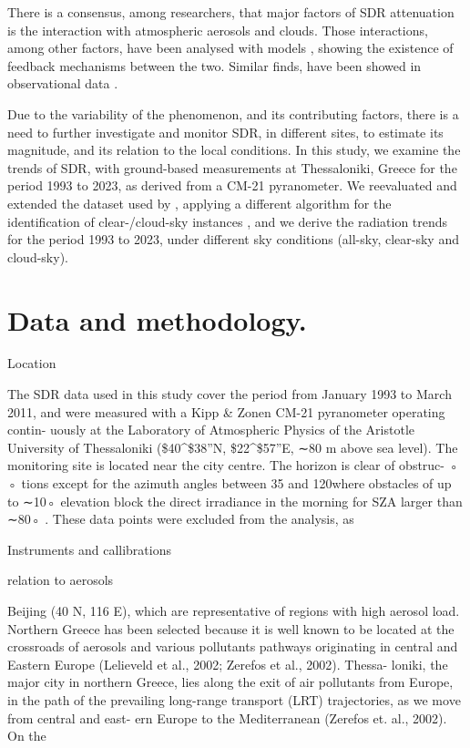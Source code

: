 \documentclass[preprint, 3p,
authoryear]{elsarticle} %
\begin{document}
There is a consensus, among researchers, that major factors of SDR
attenuation is the interaction with atmospheric aerosols and clouds.
Those interactions, among other factors, have been analysed with models
\citep{Li2016, Samset2018}, showing the existence of feedback mechanisms
between the two. Similar finds, have been showed in observational data
\citep[ and references
therein]{Schwarz2020, Ohvril2009, Zerefos2009, Xia2007}.

Due to the variability of the phenomenon, and its contributing factors,
there is a need to further investigate and monitor SDR, in different
sites, to estimate its magnitude, and its relation to the local
conditions. In this study, we examine the trends of SDR, with
ground-based measurements at Thessaloniki, Greece for the period 1993 to
2023, as derived from a CM-21 pyranometer. We reevaluated and extended
the dataset used by \citet{Bais2013}, applying a different algorithm for
the identification of clear-/cloud-sky instances
\citep{Reno2016, Reno2012a}, and we derive the radiation trends for the
period 1993 to 2023, under different sky conditions (all-sky, clear-sky
and cloud-sky).

\hypertarget{data-and-methodology.}{%
\section{Data and methodology.}\label{data-and-methodology.}}

Location

The SDR data used in this study cover the period from January 1993 to
March 2011, and were measured with a Kipp \& Zonen CM-21 pyranometer
operating contin- uously at the Laboratory of Atmospheric Physics of the
Aristotle University of Thessaloniki (\$40\^{}\circ\$38''N,
\$22\^{}\circ\$57''E, ∼80 m above sea level). The monitoring site is
located near the city centre. The horizon is clear of obstruc- ◦ ◦ tions
except for the azimuth angles between 35 and 120where obstacles of up to
∼10◦ elevation block the direct irradiance in the morning for SZA larger
than ∼80◦ . These data points were excluded from the analysis, as

Instruments and callibrations

relation to aerosols

Beijing (40 N, 116 E), which are representative of regions with high
aerosol load. Northern Greece has been selected because it is well known
to be located at the crossroads of aerosols and various pollutants
pathways originating in central and Eastern Europe (Lelieveld et al.,
2002; Zerefos et al., 2002). Thessa- loniki, the major city in northern
Greece, lies along the exit of air pollutants from Europe, in the path
of the prevailing long-range transport (LRT) trajectories, as we move
from central and east- ern Europe to the Mediterranean (Zerefos et. al.,
2002). On the
\end{document}
